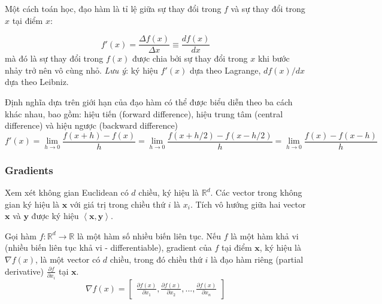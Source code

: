 Một cách toán học, đạo hàm là tỉ lệ giữa sự thay đổi trong $f$ và sự thay đổi trong $x$ tại điểm $x$:

\begin{equation}
    f'(x) = \frac{\Delta f(x)}{\Delta x} \equiv \frac{d f(x)}{d x}
\end{equation}
mà đó là sự thay đổi trong $f(x)$ được chia bởi sự thay đổi trong $x$ khi bước nhảy trở nên vô cùng nhỏ. \emph{Lưu ý}: ký hiệu $f'(x)$ dựa theo Lagrange, $d f(x) / dx$ dựa theo Leibniz.

Định nghĩa dựa trên giới hạn của đạo hàm có thể được biểu diễn theo ba cách khác nhau, bao gồm: hiệu tiến (forward difference), hiệu trung tâm (central difference) và hiệu ngược (backward difference)
\begin{equation}
	f'(x) = \displaystyle \lim_{h \to 0}\frac{f(x+h)-f(x)}{h} = \displaystyle \lim_{h \to 0}\frac{f(x+h/2)-f(x-h/2)}{h}=\displaystyle \lim_{h \to 0}\frac{f(x)-f(x-h)}{h}
\end{equation}

\subsubsection{Gradients}

Xem xét không gian Euclidean có $d$ chiều, ký hiệu là $\mathbb{R}^d$. Các vector trong không gian ký hiệu là $\mathbf{x}$ với giá trị trong chiều thứ $i$ là $x_i$. Tích vô hướng giữa hai vector $\mathbf{x}$ và $\mathbf{y}$ được ký hiệu $\left<\mathbf{x}, \mathbf{y}\right>$.

Gọi hàm $f: \mathbb{R}^d \rightarrow \mathbb{R}$ là một hàm số nhiều biến liên tục. Nếu $f$ là một hàm khả vi (nhiều biến liên tục khả vi - differentiable), gradient của $f$ tại điểm $\mathbf{x}$, ký hiệu là $\nabla f(x)$, là một vector có $d$ chiều, trong đó chiều thứ $i$ là đạo hàm riêng (partial derivative) $\frac{\partial f}{\partial x_i}$ tại $\mathbf{x}$.
\begin{equation}
    \nabla f(x) =
    \begin{bmatrix}
	    \frac{\partial f(x)}{\partial x_1}, \frac{\partial f(x)}{\partial x_2}, ..., \frac{\partial f(x)}{\partial x_n}
	\end{bmatrix}
\end{equation}


